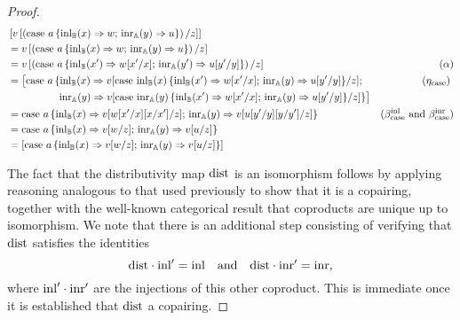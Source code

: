 \documentclass[10pt,a4paper]{amsart}
\theoremstyle{definition}
\theoremstyle{definition}
\theoremstyle{definition}
\theoremstyle{definition}
\theoremstyle{definition}
\theoremstyle{definition}
\begin{document}
\begin{proof}
\begin{align*}
  &\left[v\left[ \left(\text{case } a \,\{\mathrm{inl}_{\mathbb{B}}(x) \Rightarrow w ; \, \mathrm{inr}_{\mathbb{A}}(y) \Rightarrow u\}\right)  / z \right]\right] & \\
  &  = v \left[ \left(\text{case } a \,\{\mathrm{inl}_{\mathbb{B}}(x) \Rightarrow w ; \, \mathrm{inr}_{\mathbb{A}}(y) \Rightarrow u\}\right)  / z \right] & \\
  & =v  \left[ \left(\text{case } a \,\{\mathrm{inl}_{\mathbb{B}}(x') \Rightarrow w[x'/x] ; \, \mathrm{inr}_{\mathbb{A}}(y') \Rightarrow u[y'/y]\}\right)  / z \right] & (\alpha) \\
  & = \big[ \text{case } a \,\{\mathrm{inl}_{\mathbb{B}}(x) \Rightarrow v[\text{case } \mathrm{inl}_{\mathbb{B}}(x) \,\{\mathrm{inl}_{\mathbb{B}}(x') \Rightarrow w[x'/x] ; \, \mathrm{inr}_{\mathbb{A}}(y) \Rightarrow u[y'/y]\}/z] ; \, & (\eta_{\text{case}}) \ \\
   & \hspace{50pt} \mathrm{inr}_{\mathbb{A}}(y) \Rightarrow  v[\text{case } \mathrm{inr}_{\mathbb{A}}(y) \,\{\mathrm{inl}_{\mathbb{B}}(x') \Rightarrow w[x'/x] ; \, \mathrm{inr}_{\mathbb{A}}(y) \Rightarrow u[y'/y]\}/z]\}\big]  \\
   & = \text{case } a \,\{\mathrm{inl}_{\mathbb{B}}(x) \Rightarrow v[w[x'/x][x/x']/z] ; \, \mathrm{inr}_{\mathbb{A}}(y) \Rightarrow v[u[y'/y][y/y']/z]\}   & (\beta_{\text{case}}^{\text{inl}} \text{ and } \beta_{\text{case}}^{\text{inr}}  ) \\
   & =  \text{case } a \,\{\mathrm{inl}_{\mathbb{B}}(x) \Rightarrow v[w/z] ; \, \mathrm{inr}_{\mathbb{A}}(y) \Rightarrow v[u/z]\}  \\
   & = \left[ \text{case } a \,\{\mathrm{inl}_{\mathbb{B}}(x) \Rightarrow v[w/z] ; \, \mathrm{inr}_{\mathbb{A}}(y) \Rightarrow v[u/z]\}\right] 
\end{align*}



The fact that the distributivity map \(\mathrm{dist}\) is an isomorphism follows by applying reasoning analogous to that used previously to show that it is a copairing, together with the well-known categorical result that coproducts are unique up to isomorphism. We note that there is an additional step consisting of verifying that \(\mathrm{dist}\) satisfies the identities
\[
\mathrm{dist} \cdot \mathrm{inl}' = \mathrm{inl} \quad \text{and} \quad \mathrm{dist} \cdot \mathrm{inr}' = \mathrm{inr},
\]
where $\mathrm{inl}' \cdot \mathrm{inr}'$ are the injections of this other coproduct. This is immediate once it is established that \(\mathrm{dist}\) a copairing.


\end{proof}
\end{document}
